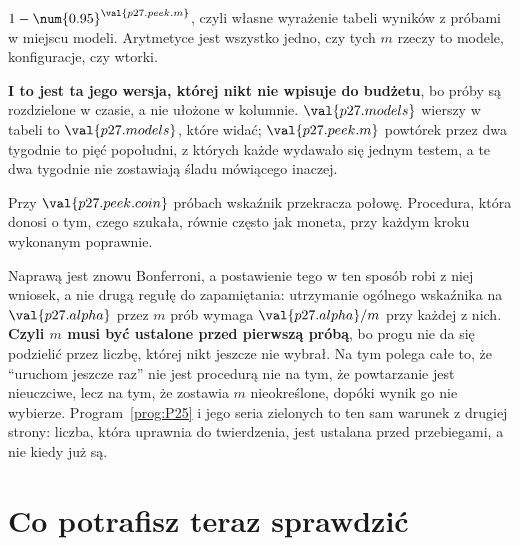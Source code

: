 \begin{fr}

$1 - \num{0.95}^{\val{p27.peek.m}}$, czyli własne wyrażenie tabeli wyników z
próbami w miejscu modeli. Arytmetyce jest wszystko jedno, czy tych $m$ rzeczy
to modele, konfiguracje, czy wtorki.

\textbf{I to jest ta jego wersja, której nikt nie wpisuje do budżetu}, bo
próby są rozdzielone w czasie, a nie ułożone w kolumnie. $\val{p27.models}$
wierszy w tabeli to $\val{p27.models}$, które widać; $\val{p27.peek.m}$ powtórek
przez dwa tygodnie to pięć popołudni, z których każde wydawało się jednym
testem, a te dwa tygodnie nie zostawiają śladu mówiącego inaczej.

Przy $\val{p27.peek.coin}$ próbach wskaźnik przekracza połowę. Procedura, która
donosi o tym, czego szukała, równie często jak moneta, przy każdym kroku
wykonanym poprawnie.

Naprawą jest znowu Bonferroni, a postawienie tego w ten sposób robi z niej
wniosek, a nie drugą regułę do zapamiętania: utrzymanie ogólnego wskaźnika na
$\val{p27.alpha}$ przez $m$ prób wymaga $\val{p27.alpha}/m$ przy każdej z
nich. \textbf{Czyli $m$ musi być ustalone przed pierwszą próbą}, bo progu nie
da się podzielić przez liczbę, której nikt jeszcze nie wybrał. Na tym polega
całe to, że \enquote{uruchom jeszcze raz} nie jest procedurą \dash{} nie na tym, że
powtarzanie jest nieuczciwe, lecz na tym, że zostawia $m$ nieokreślone, dopóki
wynik go nie wybierze. Program~\ref{prog:P25} i jego seria zielonych to ten
sam warunek z drugiej strony: liczba, która uprawnia do twierdzenia, jest
ustalana przed przebiegami, a nie kiedy już są.
\end{fr}

\section{Co potrafisz teraz sprawdzić}
\label{sec:P27-check}

